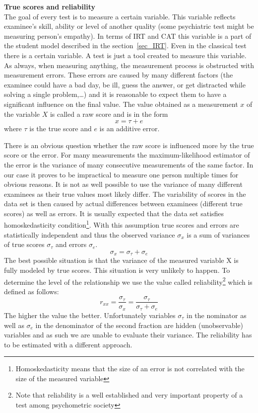 \textbf{True scores and reliability}\\
The goal of every test is to measure a certain variable. This variable reflects examinee's skill, ability or level of another quality (some psychiatric test might be measuring person's empathy). In terms of IRT and CAT this variable is a part of the student model described in the section~\ref{sec_IRT}. Even in the classical test there is a certain variable. A test is just a tool created to measure this variable. As always, when measuring anything, the measurement process is obstructed with measurement errors. These errors are caused by many different factors (the examinee could have a bad day, be ill, guess the answer, or get distracted while solving a single problem,\ldots) and it is reasonable to expect them to have a significant influence on the final value. The value obtained as a measurement $x$ of the variable $X$ is called a raw score and is in the form
$$x = \tau + e$$
where $\tau$ is the true score and $e$ is an additive error. 

There is an obvious question whether the raw score is influenced more by the true score or the error. For many measurements the maximum-likelihood estimator of the error is the variance of many consecutive measurements of the same factor. In our case it proves to be impractical to measure one person multiple times for obvious reasons. It is not as well possible to use the variance of many different examinees as their true values most likely differ. The variability of scores in the data set is then caused by actual differences between examinees (different true scores) as well as errors. It is usually expected that the data set satisfies homoskedasticity condition\footnote{Homoskedasticity means that the size of an error is not correlated with the size of the measured variable}. With this assumption true scores and errors are statistically independent and thus the observed variance $\sigma_x$ is a sum of variances of true scores $\sigma_\tau$ and errors $\sigma_e$.
$$\sigma_x=\sigma_\tau+\sigma_e$$
The best possible situation is that the variance of the measured variable X is fully modeled by true scores. This situation is very unlikely to happen. To determine the level of the relationship we use the value called reliability\footnote{Note that reliability is a well established and very important property of a test among psychometric society} which is defined as follows:
$$r_{xx} = \frac{\sigma_\tau}{\sigma_x}=\frac{\sigma_\tau}{\sigma_\tau+\sigma_e}$$
The higher the value the better. Unfortunately variables $\sigma_\tau$ in the nominator as well as $\sigma_e$ in the denominator of the second fraction are hidden (unobservable) variables and as such we are unable to evaluate their variance. The reliability has to be estimated with a different approach. 

